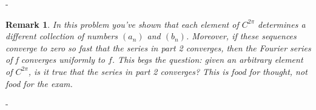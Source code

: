 \documentclass[12pt]{article}
\makeatletter
\newtheorem*{remark}{Remark}
\theoremstyle{ex215}
\newcounter{probcount}
\newlength\probsep
\newlength\pshrinking
\newenvironment{problems}%
  {\ifhmode\unskip\par\fi\setcounter{probcount}{0}\probsep\parskip
  \sbox\@tempboxa{\textbf{9.}}\pshrinking\wd\@tempboxa\advance\pshrinking\labelsep
  \advance\linewidth -\pshrinking
  \advance\@totalleftmargin\pshrinking
  \advance\leftskip\pshrinking}%
  {\ifhmode\unskip \par\fi\advance\leftskip-\pshrinking}%
\newcommand{\Reals}{\ensuremath{\mathbb R}}
\let\RR\Reals
\makeatother
\begin{document}
\begin{problems}
\begin{enumerate}
\end{enumerate}

\begin{remark}  
 In this problem you've shown that each element of $C^{2\pi}$ determines a different
collection of numbers $(a_n)$ and $(b_n)$. Moreover, if these sequences converge to zero so
fast that the series in part 2 converges, then the Fourier series of f converges uniformly
to $f$. This begs the question: given an arbitrary element of $C^{2\pi}$, is it true that the series in part 2 converges? This is food for thought, not food for the exam.
\end{remark}
\newpage









\end{problems}
\end{document}
